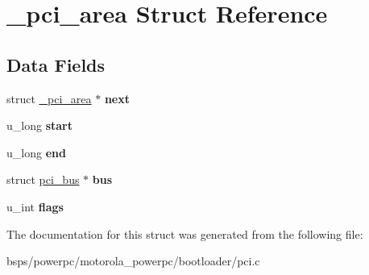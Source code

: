 \hypertarget{struct__pci__area}{}\section{\+\_\+pci\+\_\+area Struct Reference}
\label{struct__pci__area}
\subsection*{Data Fields}
\begin{DoxyCompactItemize}
\item 
\mbox{\label{struct__pci__area_a9fcd4a270d4d8959385db36c4f0fc1f0}} 
struct \mbox{\hyperlink{struct__pci__area}{\+\_\+pci\+\_\+area}} $\ast$ {\bfseries next}
\item 
\mbox{\label{struct__pci__area_a80c84c302efe4e2313c3c95517439e24}} 
u\+\_\+long {\bfseries start}
\item 
\mbox{\label{struct__pci__area_ab35b95b8d5c010f9af01d105b8a95069}} 
u\+\_\+long {\bfseries end}
\item 
\mbox{\label{struct__pci__area_a4639aa7a3e7df923c967d7f17879e448}} 
struct \mbox{\hyperlink{structpci__bus}{pci\+\_\+bus}} $\ast$ {\bfseries bus}
\item 
\mbox{\label{struct__pci__area_a073cbb7266d132df735a4fdfdbf91642}} 
u\+\_\+int {\bfseries flags}
\end{DoxyCompactItemize}


The documentation for this struct was generated from the following file\+:\begin{DoxyCompactItemize}
\item 
bsps/powerpc/motorola\+\_\+powerpc/bootloader/pci.\+c\end{DoxyCompactItemize}
